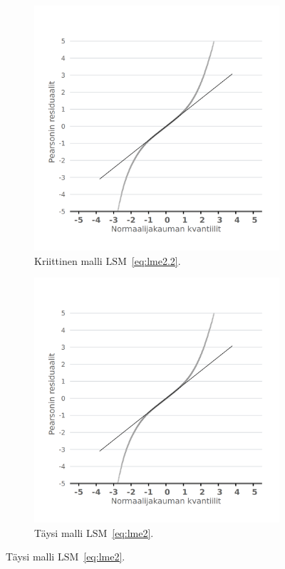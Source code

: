 \documentclass[finnish]{docopts}
\begin{document}
\begin{figure}[H]
\centering
\begin{subfigure}[b]{0.4\textwidth}
\centering
  \includegraphics[width=.8\linewidth]{kuvaajat/lme3_qq.png}
  \caption{Kriittinen malli $\text{LSM}$~\ref{eq:lme2.2}.}
  \label{fig:lme_krit_qq}
\end{subfigure}%
\begin{subfigure}[b]{0.4\textwidth}
\centering
  \includegraphics[width=.8\linewidth]{kuvaajat/lme3_full_qq.png}
  \caption{Täysi malli $\text{LSM}$~\ref{eq:lme2}.}
  \label{fig:lme_taysi_qq}
\end{subfigure}

\end{figure}
\end{document}
